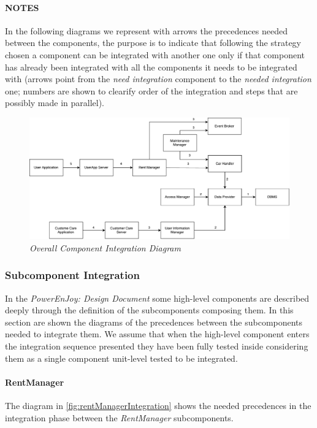 \paragraph{NOTES} In the following diagrams we represent with arrows the precedences needed between the components, the purpose is to indicate that following the strategy chosen a component can be integrated with another one only if that component has already been integrated with all the components it needs to be integrated with (arrows point from the \emph{need integration} component to the \emph{needed integration} one; numbers are shown to clearify order of the integration and steps that are possibly made in parallel).\\


	\begin{figure}[h]
			\centering
			\includegraphics[width=\linewidth]{img/overallIntegration}
			\caption{
				\label{fig:overallIntegration} 
				\emph{Overall Component Integration Diagram}
			}
	\end{figure}
	
\clearpage
\subsubsection{Subcomponent Integration}
In the \emph{PowerEnJoy: Design Document} \cite{DD} some high-level components are described deeply through the definition of the subcomponents composing them.
In this section are shown the diagrams of the precedences between the subcomponents needed to integrate them. We assume that when the high-level component enters the integration sequence presented they have been fully tested inside considering them as a single component unit-level tested to be integrated.

\paragraph{RentManager} 
The diagram in \autoref{fig:rentManagerIntegration} shows the needed precedences in the integration phase between the \emph{RentManager} subcomponents.
